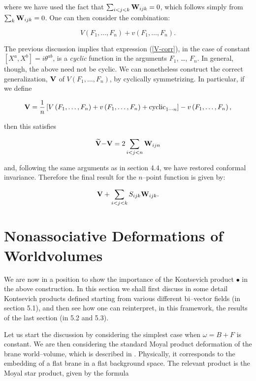 \documentclass[a4paper,11pt]{article}
\newcommand{\frak}[1]{{\bf{#1}}}
\begin{document}
\noindent
where we have used the fact that $\sum_{i<j<k}\frak{W}_{ijk}=0$, which
follows simply from $\sum_{k}\frak{W}_{ijk}=0$. One can then consider the
combination:

\begin{equation}
V\left( F_{1}, \dots, F_{n}\right) +v\left( F_{1}, \dots, F_{n}\right) .
\label{V-corr}
\end{equation}

\noindent
The previous discussion implies that expression (\ref{V-corr}), in the case
of constant $[ X^{a},X^{b} ] =i\theta^{ab}$, is a \textit{cyclic} 
function in the arguments $F_{1}$, \dots, $F_{n}$. In general, though, the
above need not be cyclic. We can nonetheless construct the correct
generalization, $\frak{V}$ of $V\left( F_{1},\dots,F_{n} \right) $, by
cyclically symmetrizing. In particular, if we define

$$
\frak{V}=\frac{1}{n}\left[ V\left( F_{1},\dots,F_{n} \right) +v\left(
F_{1},\dots,F_{n} \right) +\mathrm{cyclic}_{1\cdots n}\right] -v\left(
F_{1},\dots,F_{n} \right) ,
$$

\noindent
then this satisfies

$$
\widetilde{\frak{V}}\frak{-V}=2\sum_{i<j<n}\frak{W}_{ijn}
$$

\noindent
and, following the same arguments as in section 4.4, we have restored
conformal invariance. Therefore the final result for the $n$--point function
is given by:

$$
\frak{V}+\sum_{i<j<k}S_{ijk}\frak{W}_{ijk}.
$$


\section{Nonassociative Deformations of Worldvolumes}


We are now in a position to show the importance of the Kontsevich product
$\bullet$ in the above construction. In this section we shall first discuss
in some detail Kontsevich products defined starting from various different
bi--vector fields (in section 5.1), and then see how one can reinterpret,
in this framework, the results of the last section (in 5.2 and 5.3).

Let us start the discussion by considering the simplest case when $\omega
=B+F$ is constant. We are then considering the standard Moyal product
deformation of the brane world--volume, which is described in \cite
{Schomerus, Seiberg-Witten}. Physically, it corresponds to the embedding of
a flat brane in a flat background space. The relevant product is the Moyal
star product, given by the formula
\end{document}
